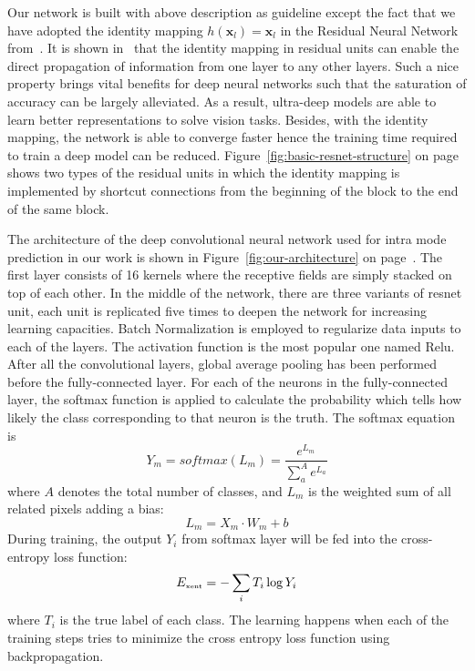 Our network is built with above description as guideline except the 
fact that we have adopted the identity mapping 
\(h(\mathbf{x}_l)=\mathbf{x}_l\) in the Residual 
Neural Network from~\parencite{RN67}.
It is shown in~\parencite{RN68} that
the identity mapping in residual units
can enable the direct propagation of information
from one layer to any other layers.
Such a nice property brings vital benefits
for deep neural networks such that the saturation of accuracy
can be largely alleviated.
As a result, ultra-deep models are able to
learn better representations to solve
vision tasks.
Besides, with the identity mapping, the network
is able to converge faster hence the training time
required to train a deep model can be reduced.
Figure~\ref{fig:basic-resnet-structure} on 
page~\pageref{fig:basic-resnet-structure}
shows two types
of the residual units in which the identity mapping
is implemented by shortcut connections from 
the beginning of the block
to the end of the same block.

The architecture of the deep convolutional neural 
network used for intra mode prediction in our work
is shown in Figure~\ref{fig:our-architecture} on
page~\pageref{fig:our-architecture}.
The first layer consists of 16 kernels where
the receptive fields are 
simply stacked on top of each other.
In the middle of the network, there are
three variants of resnet unit, each unit
is replicated five times to deepen the network
for increasing learning capacities.
Batch Normalization is employed to regularize
data inputs to each of the layers.
The activation function is the most popular one named Relu.
After all the convolutional layers, global average pooling
has been performed before the fully-connected layer.
For each of the neurons in the fully-connected layer,
the softmax function is applied to calculate 
the probability which tells how likely
the class corresponding to that neuron is the truth.
The softmax equation is
\begin{equation}
    Y_m = softmax(L_m) = \displaystyle\frac{e^{L_m}}{\displaystyle\sum_{a}^{A} e^{L_a}}
\end{equation}
where \(A\) denotes the total number of classes, and \(L_m\) is the weighted sum of all related pixels adding a bias:
\begin{equation}
    L_m = X_m\cdot W_m + b
\end{equation}
During training, the output \(Y_i\) from softmax layer
will be fed into the cross-entropy loss function:
\begin{equation}
    \label{eq:entropy}
    E_{\mbox{\tiny xent}} = -\sum_i T_i \log Y_i
\end{equation}
where \(T_i\) is the true label of each class.
The learning happens when each of the training steps 
tries to minimize the cross entropy loss function
using backpropagation.

